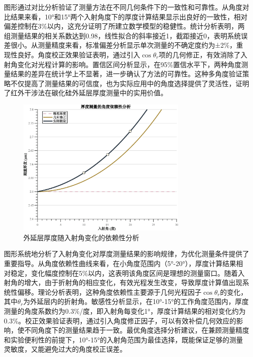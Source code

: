 \documentclass[withoutpreface,bwprint]{cumcmthesis}
\begin{document}
图形通过对比分析验证了测量方法在不同几何条件下的一致性和可靠性。从角度对比结果来看，10°和15°两个入射角度下的厚度计算结果显示出良好的一致性，相对偏差控制在3\%以内，这充分证明了所建立数学模型的稳健性。统计分析表明，两组测量结果的相关系数达到0.98，线性拟合的斜率接近1，截距接近0，表明系统误差很小。从测量精度来看，标准偏差分析显示单次测量的不确定度约为±2\%，重现性良好。角度校正效果验证表明，通过引入$\cos\theta_r$项的几何修正，有效消除了入射角变化对光程计算的影响。置信区间分析显示，在95\%置信水平下，两种角度测量结果的差异在统计学上不显著，进一步确认了方法的可靠性。这种多角度验证策略不仅提高了测量结果的可信度，也为实际应用中的角度选择提供了灵活性，证明了红外干涉法在碳化硅外延层厚度测量中的实用价值。

\begin{figure}[H]
\centering
\includegraphics[width=0.75\textwidth]{figures/angle_dependency.eps}
\caption{外延层厚度随入射角变化的依赖性分析}
\label{fig:角度依赖性分析}
\end{figure}

图形系统地分析了入射角变化对厚度测量结果的影响规律，为优化测量条件提供了重要指导。从角度依赖性曲线来看，在小角度范围内（5°-20°），厚度计算结果相对稳定，变化幅度控制在5\%以内，这表明该角度区间是理想的测量窗口。随着入射角的增大，由于折射角的相应变化，有效光程发生改变，导致厚度计算值出现系统性偏移。理论分析表明，这种角度依赖性主要源于几何光程因子$\cos\theta_r$的变化，其中$\theta_r$为外延层内的折射角。敏感性分析显示，在10°-15°的工作角度范围内，厚度测量的角度系数约为0.3\%/度，即入射角每变化1°，厚度计算结果的相对变化约为0.3\%。校正效果验证表明，通过引入角度修正因子，可以有效补偿几何效应的影响，使不同角度下的测量结果趋于一致。最优角度选择分析建议，在兼顾测量精度和实验便利性的前提下，10°-15°的入射角范围为最佳选择，既能保证足够的测量灵敏度，又能避免过大的角度校正误差。
\end{document}

